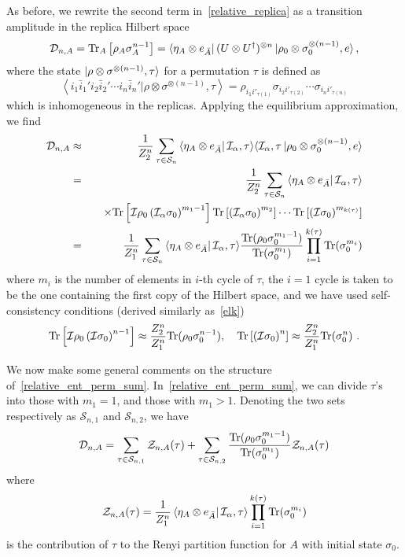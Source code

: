 \documentclass[a4paper,11pt]{article}
\newcommand\vev[1]{{\ensuremath{\left\langle{#1}\right\rangle}}}
\newcommand{\be}{\begin{equation}}
\newcommand{\ee}{\end{equation}}
\newcommand{\bea}{\begin{eqnarray}}
\newcommand{\eea}{\end{eqnarray}}
\newcommand\al{{\alpha}}
\newcommand\sig{\sigma}
\newcommand\ov{\over}
\def\le{\left}
\newcommand\sD{{\ensuremath{{\mathcal D}}}}
\newcommand\sS{{\mathcal S}}
\newcommand\sZ{{\mathcal Z}}
\newcommand{\Tr}{\text{Tr}}
\begin{document}
As before, we rewrite the second term in~\eqref{relative_replica} as a transition amplitude in the replica Hilbert space
\begin{align}
 \mathcal{D}_{n,A} = \Tr_{A} \left[\rho_{A} \sigma_{A}^{n-1}\right] = 
 \bra{\eta_{A} \otimes e_{\bar A}} (U\otimes U^{\dagger})^{\otimes n} \ket{\rho_0 \otimes \sigma_0^{\otimes (n-1)}, e} ,
\end{align}
where the state $\ket{\rho \otimes \sig^{\otimes (n-1)}, \tau}$ for a permutation $\tau$ is defined as 
\be 
\vev{i_1 \bar i_1' i_2 \bar i_2' \cdots i_n \bar i_n'|\rho \otimes \sig^{\otimes (n-1)}, \tau}
= \rho_{i_1 i'_{\tau (1)}} \sig_{i_2 i'_{\tau (2)}} \cdots 
\sig_{i_n i'_{\tau (n)}} 
\ee
which is inhomogeneous in the replicas. 
Applying the equilibrium approximation, we find 
\bea 
 \sD_{n,A} & \approx &
 \frac{1}{Z_2^n}\sum_{\tau \in \mathcal{S}_n} \bra{\eta_{A} \otimes e_{\bar A}}\mathcal{I}_\al, \tau \rangle \langle \mathcal{I}_\al, \tau \ket{\rho_0 \otimes \sigma_0^{\otimes (n-1)}, e} \\
 & =& \frac{1}{Z_2^n}\sum_{\tau \in \mathcal{S}_n} \bra{\eta_{A} \otimes e_{\bar A}}\mathcal{I}_\al, \tau \rangle \nonumber \\
 && \quad \times \Tr\left[\mathcal{I} \rho_0 \left( \mathcal{I}_\al \sigma_0 \right)^{m_1-1}\right]\Tr\left[\left( \mathcal{I}_\al \sigma_0 \right)^{m_2}\right]
 \cdots \Tr\left[\left( \mathcal{I} \sigma_0 \right)^{m_{k (\tau)}}\right] \\
 & = & {1 \ov Z_1^n} \sum_{\tau \in \mathcal{S}_n} \bra{\eta_{A} \otimes e_{\bar A}}\mathcal{I}_\al, \tau \rangle 
 {\Tr (\rho_0 \sig_0^{m_1-1}) \ov \Tr (\sig_0^{m_1})} \prod_{i=1}^{k (\tau)} \Tr (\sig_0^{m_i} )
 \label{relative_ent_perm_sum}
 \eea
where $m_i$ is the number of elements in $i$-th cycle of $\tau$, the $i=1$ cycle is taken to be the one containing the first copy of the Hilbert space, and we have used self-consistency conditions (derived similarly as~\eqref{elk})
\be 
 \Tr\left[\mathcal{I} \rho_0 \left( \mathcal{I}\sigma_0 \right)^{n-1}\right] \approx {Z_2^n \ov Z_1^n} \Tr (\rho_0 \sig_0^{n-1}), \quad
 \Tr\left[ \le(\mathcal{I}\sigma_0 \right)^{n}\right] \approx {Z_2^n \ov Z_1^n} \Tr (\sig_0^{n}) \ .
 \ee



We now make some general comments on the structure of~\eqref{relative_ent_perm_sum}. 
In~\eqref{relative_ent_perm_sum}, we can divide $\tau$'s into those with $m_1 =1$, and those with $m_1 > 1$. Denoting the two sets respectively as $\sS_{n,1}$ and $\sS_{n,2}$, we have 
\be \label{eons}
\sD_{n,A} = 
 \sum_{\tau \in \mathcal{S}_{n,1}} \sZ_{n, A} (\tau) + \sum_{\tau \in \sS_{n,2}} {\Tr (\rho_0 \sig_0^{m_1-1}) \ov \Tr (\sig_0^{m_1})} \sZ_{n, A} (\tau)
 \ee
where 
\be 
\sZ_{n, A} (\tau)= {1 \ov Z_1^n} \bra{\eta_{A} \otimes e_{\bar A}}\mathcal{I}_\al, \tau \rangle 
 \prod_{i=1}^{k (\tau)} \Tr (\sig_0^{m_i} )
\ee
is the contribution of $\tau$ to the Renyi partition function for $A$ with initial state $\sig_0$. 
\end{document}
